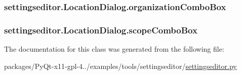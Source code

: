 \subsubsection[{organization\+Combo\+Box}]{\setlength{\rightskip}{0pt plus 5cm}settingseditor.\+Location\+Dialog.\+organization\+Combo\+Box}\label{classsettingseditor_1_1LocationDialog_a0338e4725a23a529252019ca3d8242ff}
\hypertarget{classsettingseditor_1_1LocationDialog_a08efd0f436bc54ceffbad1d16200257b}{}
\subsubsection[{scope\+Combo\+Box}]{\setlength{\rightskip}{0pt plus 5cm}settingseditor.\+Location\+Dialog.\+scope\+Combo\+Box}\label{classsettingseditor_1_1LocationDialog_a08efd0f436bc54ceffbad1d16200257b}


The documentation for this class was generated from the following file\+:\begin{DoxyCompactItemize}
\item 
packages/\+Py\+Qt-\/x11-\/gpl-\/4../examples/tools/settingseditor/\hyperlink{settingseditor_8py}{settingseditor.\+py}\end{DoxyCompactItemize}
